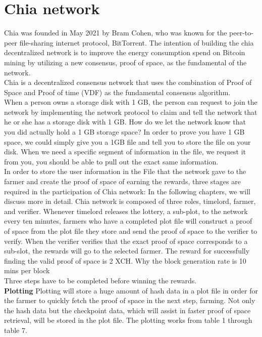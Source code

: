 \documentclass[sigconf, nonacm, natbib=false]{acmart}
\begin{document}
\section{Chia network}
Chia was founded in May 2021 by Bram Cohen, who was known for the peer-to-peer file-sharing internet protocol, BitTorrent. The intention of building the chia decentralized network is to improve the energy consumption spend on Bitcoin mining by utilizing a new consensus, proof of space, as the fundamental of the network. \\
Chia is a decentralized consensus network that uses the combination of Proof of Space and Proof of time (VDF) as the fundamental consensus algorithm. \\
When a person owns a storage disk with 1 GB, the person can request to join the network by implementing the network protocol to claim and tell the network that he or she has a storage disk with 1 GB. How do we let the network know that you did actually hold a 1 GB storage space? In order to prove you have 1 GB space, we could simply give you a 1GB file and tell you to store the file on your disk. When we need a specific segment of information in the file, we request it from you, you should be able to pull out the exact same information. \\
In order to store the user information in the File that the network gave to the farmer and create the proof of space of earning the rewards, three stages are required in the participation of Chia network: In the following chapters, we will discuss more in detail.
Chia network is composed of three roles, timelord, farmer, and verifier. Whenever timelord releases the lottery, a sub-plot, to the network every ten minutes, farmers who have a completed plot file will construct a proof of space from the plot file they store and send the proof of space to the verifier to verify. When the verifier verifies that the exact proof of space corresponds to a sub-slot, the rewards will go to the selected farmer. The reward for successfully finding the valid proof of space is 2 XCH. Why the block generation rate is 10 mins per block\\
Three steps have to be completed before winning the rewards. \\ 
{\bf Plotting}
Plotting will store a huge amount of hash data in a plot file in order for the farmer to quickly fetch the proof of space in the next step, farming.  
Not only the hash data but the checkpoint data, which will assist in faster proof of space retrieval, will be stored in the plot file. The plotting works from table 1 through table 7. \\
\end{document}
